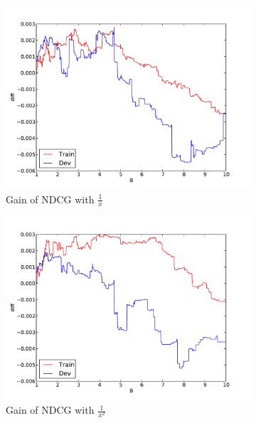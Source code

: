 \documentclass{article}
\begin{document}
\begin{figure}[!htb]
  \centering
  \begin{subfigure}{.3333\textwidth}
      \centering
      \includegraphics[width=\linewidth]{sw.pdf}
      \caption{Gain of NDCG with $\frac{1}{x}$}
      \label{fig:diff-inverse}
  \end{subfigure}%
  \begin{subfigure}{.3333\textwidth}
      \centering
      \includegraphics[width=\linewidth]{sw-square.pdf}
      \caption{Gain of NDCG with $\frac{1}{x^2}$}
      \label{fig:diff-square}
  \end{subfigure}%
  \begin{subfigure}{.3333\textwidth}
      \centering

\end{subfigure}
\end{figure}
\end{document}
